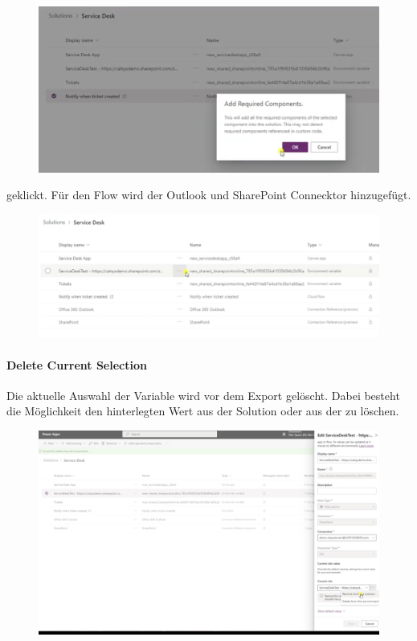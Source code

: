 \begin{figure}[H]
	\centering
	\includegraphics[scale = 0.3]{attachment/chapter_13/Scc060}
\end{figure}

geklickt. Für den Flow wird der Outlook und SharePoint Connecktor hinzugefügt.

\begin{figure}[H]
	\centering
	\includegraphics[scale = 0.3]{attachment/chapter_13/Scc061}
\end{figure}

\paragraph{Delete Current Selection}
Die aktuelle Auswahl der \Env Variable wird vor dem Export gelöscht. Dabei besteht die Möglichkeit den hinterlegten Wert aus der Solution oder aus der \Env zu löschen.

\begin{figure}[H]
	\centering
	\includegraphics[scale = 0.3]{attachment/chapter_13/Scc062}
\end{figure}

